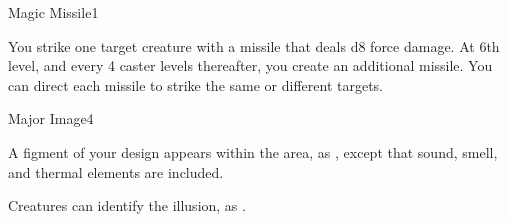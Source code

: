 \begin{spellsection}{Magic Missile}{1}
\begin{spellheader}
\end{spellheader}
\begin{spellcontent}
    \begin{spelltargetinginfo}
    \end{spelltargetinginfo}
    \begin{spelleffects}
        \spelleffect You strike one target creature with a missile that deals d8 force damage. At 6th level, and every 4 caster levels thereafter, you create an additional missile. You can direct each missile to strike the same or different targets.
    \end{spelleffects}
\end{spellcontent}
\begin{spellfooter}
    \forcespellnotes
\end{spellfooter}
\end{spellsection}

\begin{spellsection}{Major Image}{4}
\begin{spellheader}
\end{spellheader}
\begin{spellcontent}
    \begin{spelltargetinginfo}
    \end{spelltargetinginfo}
    \begin{spelleffects}
        \spelleffect A figment of your design appears within the area, as , except that sound, smell, and thermal elements are included.
        \spelldur \durshort
    \end{spelleffects}
\end{spellcontent}
\begin{spellfooter}
    \spellnotes Creatures can identify the illusion, as .
\end{spellfooter}
\end{spellsection}

